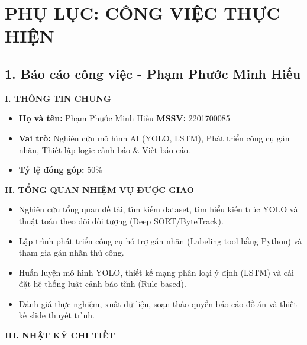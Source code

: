 \newpage
\appendix
\chapter*{PHỤ LỤC: CÔNG VIỆC THỰC HIỆN}

\section*{1. Báo cáo công việc - Phạm Phước Minh Hiếu}

\textbf{I. THÔNG TIN CHUNG}
\begin{itemize}
	\item \textbf{Họ và tên:} Phạm Phước Minh Hiếu \hspace{1cm} \textbf{MSSV:} 2201700085
	\item \textbf{Vai trò:} Nghiên cứu mô hình AI (YOLO, LSTM), Phát triển công cụ gán nhãn, Thiết lập logic cảnh báo \& Viết báo cáo.
	\item \textbf{Tỷ lệ đóng góp:} 50\%
\end{itemize}

\textbf{II. TỔNG QUAN NHIỆM VỤ ĐƯỢC GIAO}
\begin{itemize}
	\item Nghiên cứu tổng quan đề tài, tìm kiếm dataset, tìm hiểu kiến trúc YOLO và thuật toán theo dõi đối tượng (Deep SORT/ByteTrack).
	\item Lập trình phát triển công cụ hỗ trợ gán nhãn (Labeling tool bằng Python) và tham gia gán nhãn thủ công.
	\item Huấn luyện mô hình YOLO, thiết kế mạng phân loại ý định (LSTM) và cài đặt hệ thống luật cảnh báo tĩnh (Rule-based).
	\item Đánh giá thực nghiệm, xuất dữ liệu, soạn thảo quyển báo cáo đồ án và thiết kế slide thuyết trình.
\end{itemize}
\pagebreak
\textbf{III. NHẬT KÝ CHI TIẾT}

